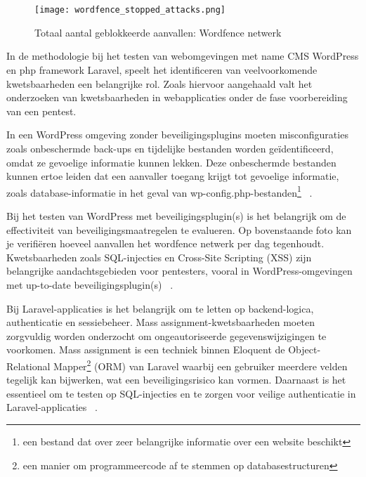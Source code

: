 \section{}
\label{sec:Webomgevingen}

\subsection{}
\label{sec:Veiligheidskwetsbaarheden in Webomgevingen}
\begin{figure}
    \centering
    \texttt{[image: wordfence\_stopped\_attacks.png]}
    \caption[Totaal aantal geblokkeerde aanvallen: Wordfence netwerk]{Totaal aantal geblokkeerde aanvallen: Wordfence netwerk}
\end{figure}

In de methodologie bij het testen van webomgevingen met name CMS WordPress en php framework Laravel, speelt het identificeren van veelvoorkomende 
kwetsbaarheden een belangrijke rol. Zoals hiervoor aangehaald valt het onderzoeken van kwetsbaarheden in webapplicaties onder 
de fase voorbereiding van een pentest.

In een WordPress omgeving zonder beveiligingsplugins moeten misconfiguraties zoals onbeschermde back-ups 
en tijdelijke bestanden worden geïdentificeerd, omdat ze gevoelige informatie kunnen lekken. Deze onbeschermde bestanden kunnen 
ertoe leiden dat een aanvaller toegang krijgt tot gevoelige informatie, zoals database-informatie in het geval van 
wp-config.php-bestanden\footnote{een bestand dat over zeer belangrijke informatie over een website beschikt} 
~\autocite{DalalanaBertoglio2017}.

Bij het testen van WordPress met beveiligingsplugin(s) is het belangrijk om de effectiviteit van beveiligingsmaatregelen te 
evalueren. Op bovenstaande foto kan je verifiëren hoeveel aanvallen het wordfence netwerk per dag tegenhoudt. Kwetsbaarheden 
zoals SQL-injecties en Cross-Site Scripting (XSS) zijn belangrijke aandachtsgebieden voor pentesters, vooral in WordPress-omgevingen 
met up-to-date beveiligingsplugin(s) ~\autocite{Albahar2022}.

Bij Laravel-applicaties is het belangrijk om te letten op backend-logica, authenticatie en sessiebeheer. 
Mass assignment-kwetsbaarheden moeten zorgvuldig worden onderzocht om ongeautoriseerde gegevenswijzigingen te voorkomen.
Mass assignment is een techniek binnen Eloquent de Object-Relational Mapper\footnote{een manier om programmeercode af 
te stemmen op databasestructuren} (ORM) van Laravel  waarbij een gebruiker meerdere velden tegelijk kan bijwerken, wat een beveiligingsrisico kan vormen. 
Daarnaast is het essentieel om te testen op SQL-injecties en te zorgen voor veilige authenticatie in Laravel-applicaties 
~\autocite{Altulaihan2023}.

